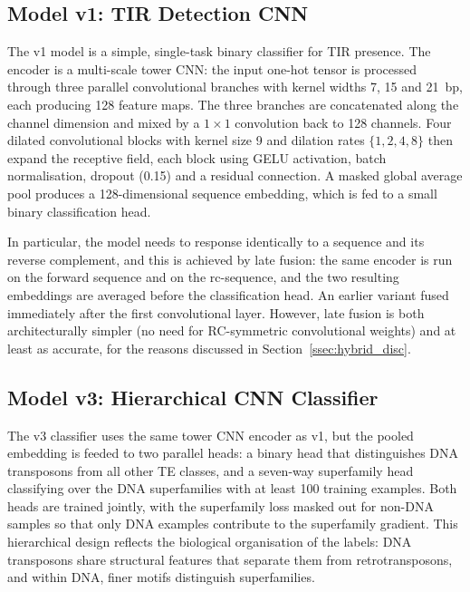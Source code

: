 \documentclass[12pt]{article}
\begin{document}
\subsection{Model v1: TIR Detection CNN}\label{ssec:methods_v1}

The v1 model is a simple, single-task binary classifier for TIR presence. The encoder is a multi-scale tower CNN: the input one-hot tensor is processed through three parallel convolutional branches with kernel widths 7, 15 and 21~bp, each producing 128 feature maps. The three branches are concatenated along the channel dimension and mixed by a $1\!\times\!1$ convolution back to 128 channels. Four dilated convolutional blocks with kernel size 9 and dilation rates $\{1, 2, 4, 8\}$ then expand the receptive field, each block using GELU activation, batch normalisation, dropout (0.15) and a residual connection. A masked global average pool produces a 128-dimensional sequence embedding, which is fed to a small binary classification head.

In particular, the model needs to response identically to a sequence and its reverse complement, and this is achieved by late fusion: the same encoder is run on the forward sequence and on the rc-sequence, and the two resulting embeddings are averaged before the classification head. An earlier variant fused immediately after the first convolutional layer. However, late fusion is both architecturally simpler (no need for RC-symmetric convolutional weights) and at least as accurate, for the reasons discussed in Section~\ref{ssec:hybrid_disc}.

\subsection{Model v3: Hierarchical CNN Classifier}\label{ssec:methods_v3}

The v3 classifier uses the same tower CNN encoder as v1, but the pooled embedding is feeded to two parallel heads: a binary head that distinguishes DNA transposons from all other TE classes, and a seven-way superfamily head classifying over the DNA superfamilies with at least 100 training examples. Both heads are trained jointly, with the superfamily loss masked out for non-DNA samples so that only DNA examples contribute to the superfamily gradient. This hierarchical design reflects the biological organisation of the labels: DNA transposons share structural features that separate them from retrotransposons, and within DNA, finer motifs distinguish superfamilies.
\end{document}
